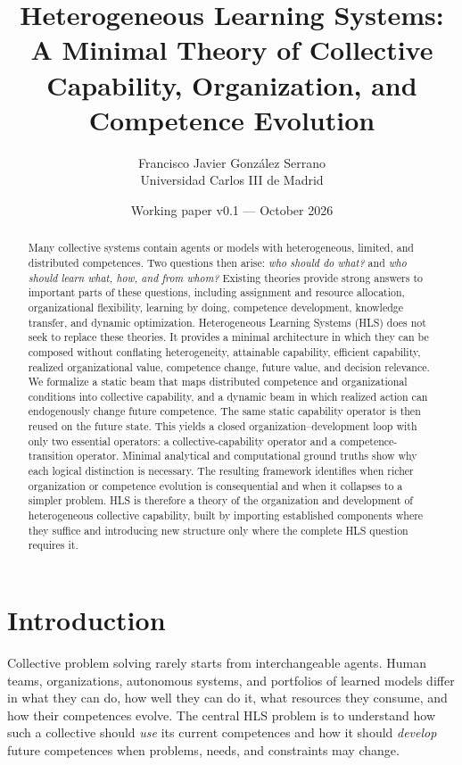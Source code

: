 \documentclass[10pt]{article}
\title{\textbf{Heterogeneous Learning Systems: A Minimal Theory of Collective Capability, Organization, and Competence Evolution}}
\author{Francisco Javier Gonz\'alez Serrano\\Universidad Carlos III de Madrid}
\date{Working paper v0.1 --- October 2026}
\begin{document}
\maketitle

\begin{abstract}
Many collective systems contain agents or models with heterogeneous, limited, and distributed competences. Two questions then arise: \emph{who should do what?} and \emph{who should learn what, how, and from whom?} Existing theories provide strong answers to important parts of these questions, including assignment and resource allocation, organizational flexibility, learning by doing, competence development, knowledge transfer, and dynamic optimization. Heterogeneous Learning Systems (HLS) does not seek to replace these theories. It provides a minimal architecture in which they can be composed without conflating heterogeneity, attainable capability, efficient capability, realized organizational value, competence change, future value, and decision relevance. We formalize a static beam that maps distributed competence and organizational conditions into collective capability, and a dynamic beam in which realized action can endogenously change future competence. The same static capability operator is then reused on the future state. This yields a closed organization--development loop with only two essential operators: a collective-capability operator and a competence-transition operator. Minimal analytical and computational ground truths show why each logical distinction is necessary. The resulting framework identifies when richer organization or competence evolution is consequential and when it collapses to a simpler problem. HLS is therefore a theory of the organization and development of heterogeneous collective capability, built by importing established components where they suffice and introducing new structure only where the complete HLS question requires it.
\end{abstract}

\section{Introduction}

Collective problem solving rarely starts from interchangeable agents. Human teams, organizations, autonomous systems, and portfolios of learned models differ in what they can do, how well they can do it, what resources they consume, and how their competences evolve. The central HLS problem is to understand how such a collective should \emph{use} its current competences and how it should \emph{develop} future competences when problems, needs, and constraints may change.
\end{document}
